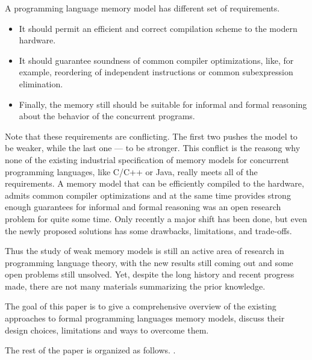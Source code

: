 \documentclass[a4paper,twoside,11pt]{article}
\numberwithin{equation}{section}
\begin{document}

A programming language memory model has different set of requirements.

\begin{itemize}
  \item It should permit an efficient and correct compilation scheme to the modern hardware.
  \item It should guarantee soundness of common compiler optimizations, like, for example, 
        reordering of independent instructions or common subexpression elimination.
  \item Finally, the memory still should be suitable for informal and formal 
        reasoning about the behavior of the concurrent programs.
\end{itemize}

Note that these requirements are conflicting. 
The first two pushes the model to be weaker, 
while the last one --- to be stronger. 
This conflict is the reasong why none of the existing industrial specification of memory models 
for concurrent programming languages, like C/C++ or Java, really meets all of the requirements.
A memory model that can be efficiently compiled to the hardware, admits common compiler optimizations 
and at the same time provides strong enough guarantees for informal and formal reasoning
was an open research problem for quite some time. 
Only recently a major shift has been done, but even the 
newly proposed solutions has some drawbacks, limitations, and trade-offs.    

Thus the study of weak memory models is still an active 
area of research in programming language theory,
with the new results still coming out and some open problems still unsolved.
Yet, despite the long history and recent progress made, 
there are not many materials summarizing the prior knowledge.

The goal of this paper is to give a comprehensive overview of 
the existing approaches to formal programming languages memory models,
discuss their design choices, limitations and ways to overcome them.   

The rest of the paper is organized as follows.
\todo{}.
\end{document}

